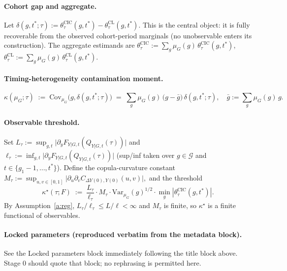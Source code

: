 \documentclass[11pt]{article}
\theoremstyle{definition}
\theoremstyle{plain}
\theoremstyle{remark}
\begin{document}
\paragraph{Cohort gap and aggregate.} Let $\delta(g, t^*; \tau) := \theta^{\mathrm{CIC}}_\tau(g, t^*) - \theta^{\mathrm{CL}}_\tau(g, t^*)$. This is the central object: it is fully recoverable from the observed cohort-period marginals (no unobservable enters its construction). The aggregate estimands are $\theta^{\mathrm{CIC}}_\tau := \sum_g \mu_G(g)\, \theta^{\mathrm{CIC}}_\tau(g, t^*)$, $\theta^{\mathrm{CL}}_\tau := \sum_g \mu_G(g)\, \theta^{\mathrm{CL}}_\tau(g, t^*)$.

\paragraph{Timing-heterogeneity contamination moment.}
\begin{equation}\label{eq:kappa}
  \kappa(\mu_G; \tau) \;:=\; \mathrm{Cov}_{\mu_G}\!\big(g, \delta(g, t^*; \tau)\big) \;=\; \sum_g \mu_G(g)\, \big(g - \bar g\big)\,\delta(g, t^*; \tau), \quad \bar g := \sum_g \mu_G(g)\, g.
\end{equation}

\paragraph{Observable threshold.} Set $L_\tau := \sup_{g, t} \big|\partial_y F_{Y|G,t}(Q_{Y|G,t}(\tau))\big|$ and $\ell_\tau := \inf_{g, t} \big|\partial_y F_{Y|G,t}(Q_{Y|G,t}(\tau))\big|$ (sup/inf taken over $g \in \mathcal{G}$ and $t \in \{g_1 - 1, \ldots, t^*\}$). Define the copula-curvature constant
\(
  M_\tau := \sup_{u, v \in [0,1]} \big|\partial_u \partial_v C_{\Delta Y(0), Y(0)}(u, v)\big|,
\)
and the threshold
\begin{equation}\label{eq:kappastar}
  \kappa^\star(\tau; F) \;:=\; \frac{L_\tau}{\ell_\tau} \cdot M_\tau \cdot \mathrm{Var}_{\mu_G}(g)^{1/2} \cdot \min_g |\theta^{\mathrm{CIC}}_\tau(g, t^*)|.
\end{equation}
By Assumption~\ref{a:reg}, $L_\tau / \ell_\tau \le L/\ell < \infty$ and $M_\tau$ is finite, so $\kappa^\star$ is a finite functional of observables.

\paragraph{Locked parameters (reproduced verbatim from the metadata block).} See the Locked parameters block immediately following the title block above. Stage 0 should quote that block; no rephrasing is permitted here.
\end{document}
